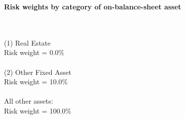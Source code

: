 \documentclass{article}
\begin{document}
\setlength{\parindent}{0em}
\begin{center}{\bf Risk weights by category of on-balance-sheet asset}\end{center}
~\\
~\\

(1) Real Estate\\
Risk weight = 0.0\%\\

~\\
(2) Other Fixed Asset\\
Risk weight = 10.0\%\\

~\\
All other assets:\\
Risk weight = 100.0\%\\

~\\
\end{document}

